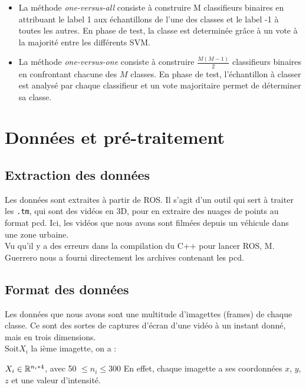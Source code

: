 	\begin{itemize}
	\item La méthode \emph{one-versus-all} consiste à construire M classifieurs binaires en attribuant le label 1 aux échantillons de l'une des classes et le label -1 à toutes les autres. En phase de test, la classe est determinée grâce à un vote à la majorité entre les différents SVM.
	\item La méthode \emph{one-versus-one} consiste à construire $\frac{M(M-1)}{2}$ classifieurs binaires en confrontant chacune des $M$ classes. En phase de test, l'échantillon à classer est analysé par chaque classifieur et un vote majoritaire permet de déterminer sa classe.\\
	\end{itemize}


\section{Données et pré-traitement}
\subsection{Extraction des données}

	Les données sont extraites à partir de ROS. Il s'agit d'un outil qui sert à traiter les \texttt{.tm}, qui sont des vidéos en 3D, pour en extraire des nuages de points au format pcd. Ici, les vidéos que nous avons sont filmées depuis un véhicule dans une zone urbaine.\\

	Vu qu’il y a des erreurs dans la compilation du C++ pour lancer ROS, M. Guerrero nous a fourni directement les archives contenant les pcd.\\

\subsection{Format des données}

	Les données que nous avons sont une multitude d'imagettes (frames) de chaque classe. Ce sont des sortes de captures d'écran d'une vidéo à un instant donné, mais en trois dimensions.\\

	Soit$ X_{i}$ la ième imagette, on a :

	$  X_{i} \in \mathbb{R}^{n_{i}*4} $, avec 50 $\leq n_{i} \leq 300$
	En effet, chaque imagette a ses coordonnées $x$, $y$, $z$ et une valeur d'intensité. \\


